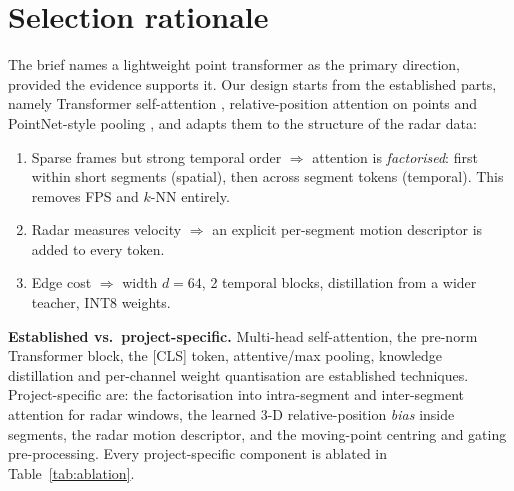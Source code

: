 \section{Selection rationale}
The brief names a lightweight point transformer as the primary direction,
provided the evidence supports it. Our design starts from the established parts,
namely Transformer self-attention \cite{vaswani2017attention}, relative-position
attention on points \cite{zhao2021pt} and PointNet-style pooling
\cite{qi2017pointnet}, and adapts them to the structure of the radar data:
\begin{enumerate}[nosep]
\item Sparse frames but strong temporal order $\Rightarrow$ attention is
  \emph{factorised}: first within short segments (spatial), then across segment
  tokens (temporal). This removes FPS and $k$-NN entirely.
\item Radar measures velocity $\Rightarrow$ an explicit per-segment motion
  descriptor is added to every token.
\item Edge cost $\Rightarrow$ width $d=64$, 2 temporal blocks, distillation from a
  wider teacher, INT8 weights.
\end{enumerate}
\textbf{Established vs.\ project-specific.} Multi-head self-attention, the
pre-norm Transformer block, the [CLS] token, attentive/max pooling, knowledge
distillation and per-channel weight quantisation are established techniques.
Project-specific are: the factorisation into intra-segment and inter-segment
attention for radar windows, the learned 3-D relative-position \emph{bias} inside
segments, the radar motion descriptor, and the moving-point centring and gating
pre-processing. Every project-specific component is ablated in
Table~\ref{tab:ablation}.

